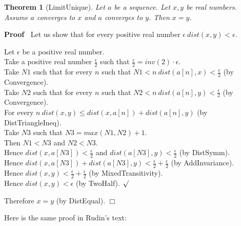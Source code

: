 \documentclass{article}
\newenvironment{forthel}{\begin{leftbar}}{\end{leftbar}}
\newenvironment{proof}{\noindent\textbf{Proof\ }}{\hspace*{\fill}$\Box$\medskip}
\newenvironment{subproof}{\begin{list}{}{}
		\item[\text{Proof}]}{\hfill $\surd$ \end{list}}
\newtheorem{theorem}{Theorem}
\newcommand{\halfeps}{\frac{\epsilon}{2}}
\begin{document}
\begin{forthel}
	\begin{theorem}[LimitUnique]
		Let $a$ be a sequence. Let $x, y$ be real numbers. Assume $a$ converges to $x$ and $a$ converges to $y$.
		Then $x = y$.
	\end{theorem}

	\begin{proof}
		Let us show that for every positive real number $\epsilon \ dist(x,y) < \epsilon$.
		\begin{subproof}
			Let $\epsilon$ be a positive real number.\\
			Take a positive real number $\halfeps$ such that $\halfeps = inv(2) \cdot \epsilon$.\\
			Take $N1$ such that for every $n$ such that $N1 < n \ dist(a[n],x) < \halfeps$ (by Convergence).\\
			Take $N2$ such that for every $n$ such that $N2 < n \ dist(a[n],y) < \halfeps$ (by Convergence).\\
			For every $n \ dist(x,y) \leq dist(x,a[n]) + dist(a[n],y)$ (by DistTriangleIneq). \\
			Take $N3$ such that $N3 = max(N1,N2) + 1$.\\
			Then $N1 < N3$ and $N2 < N3$.\\
			Hence $dist(x,a[N3]) < \halfeps$ and $dist(a[N3],y) < \halfeps$ (by DistSymm).\\
			Hence $dist(x,a[N3]) + dist(a[N3],y) < \halfeps + \halfeps$ (by AddInvariance).\\
			Hence $dist(x,y) < \halfeps + \halfeps$ (by MixedTransitivity).\\
			Hence $dist(x,y) < \epsilon$ (by TwoHalf).
		\end{subproof}
		Therefore $x = y$ (by DistEqual).
	\end{proof}
\end{forthel}

\newpage
\noindent Here is the same proof in Rudin's text:\\

\\
\end{document}

